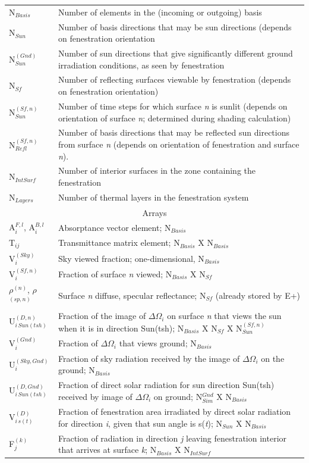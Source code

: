 \begin{longtable}[c]{p{1.5in}p{4.5in}}
N\(_{Basis}\) & Number of elements in the (incoming or outgoing) basis \tabularnewline
N\(_{Sun}\) & Number of basis directions that may be sun directions (depends on fenestration orientation \tabularnewline
N\(^{(Gnd)}_{Sun}\) & Number of sun directions that give significantly different ground irradiation conditions, as seen by fenestration \tabularnewline
N\(_{Sf}\) & Number of reflecting surfaces viewable by fenestration (depends on fenestration orientation) \tabularnewline
N\(^{(Sf,n)}_{Sun}\) & Number of time steps for which surface \emph{n} is sunlit (depends on orientation of surface \emph{n}; determined during shading calculation) \tabularnewline
N\(^{(Sf,n)}_{Refl}\) & Number of basis directions that may be reflected sun directions from surface \emph{n} (depends on orientation of fenestration and surface \emph{n}). \tabularnewline
N\(_{IntSurf}\) & Number of interior surfaces in the zone containing the fenestration \tabularnewline
N\(_{Layers}\) & Number of thermal layers in the fenestration system \tabularnewline
\multicolumn{2}{c}{Arrays} \tabularnewline
A\(^{F,l}_{i}\), A\(^{B,l}_{i}\) & Absorptance vector element; N\(_{Basis}\) \tabularnewline
T\(_{ij}\) & Transmittance matrix element; N\(_{Basis}\) X N\(_{Basis}\) \tabularnewline
V\(^{(Sky)}_{i}\) & Sky viewed fraction; one-dimensional, N\(_{Basis}\) \tabularnewline
V\(^{(Sf,n)}_{i}\) & Fraction of surface \emph{n} viewed; N\(_{Basis}\) X N\(_{Sf}\) \tabularnewline
$\rho$\(^{(n)}\), $\rho$\(^{(sp,n)}\) & Surface \emph{n} diffuse, specular reflectance; N\(_{Sf}\) (already stored by E+) \tabularnewline
U\(^{(D,n)}_{i\,Sun(tsh)}\) & Fraction of the image of $\Delta\Omega$\(_{i}\) on surface \emph{n} that views the sun when it is in direction Sun(tsh); N\(_{Basis}\) X N\(_{Sf}\) X N\(^{(Sf,n)}_{Sun}\) \tabularnewline
V\(^{(Gnd)}_{i}\) & Fraction of $\Delta\Omega$\(_{i}\) that views ground; N\(_{Basis}\) \tabularnewline
U\(^{(Sky, Gnd)}_{i}\) & Fraction of sky radiation received by the image of $\Delta\Omega$\(_{i}\) on the ground; N\(_{Basis}\) \tabularnewline
U\(^{(D,Gnd)}_{i\,Sun(tsh)}\) & Fraction of direct solar radiation for sun direction Sun(tsh) received by image of $\Delta\Omega$\(_{i}\) on ground; N\(^{Gnd}_{Sim}\) X N\(_{Basis}\) \tabularnewline
V\(^{(D)}_{i\,s(t)}\) & Fraction of fenestration area irradiated by direct solar radiation for direction \emph{i}, given that sun angle is s(\emph{t}); N\(_{Sun}\) X N\(_{Basis}\) \tabularnewline
F\(^{(k)}_{j}\) & Fraction of radiation in direction \emph{j} leaving fenestration interior that arrives at surface \emph{k}; N\(_{Basis}\) X N\(_{IntSurf}\) \tabularnewline

\end{longtable}
